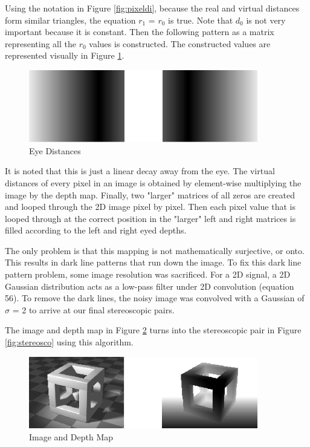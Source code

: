 \documentclass[12pt]{article}
\begin{document}
Using the notation in Figure \ref{fig:pixeldi}, because the real and virtual distances form similar triangles, the equation \(r_{1}\) = \(r_{0}\) is true. Note that \(d_{0}\) is not very important because it is constant. Then the following pattern as a matrix representing all the \(r_{0}\) values is constructed. The constructed values are represented visually in Figure \ref{fig:eyedistance}.

\begin{figure}
    \centering
    \includegraphics[width=100mm]{eye_distances.png}
    \caption{Eye Distances}
    \label{fig:eyedistance}
\end{figure}

It is noted that this is just a linear decay away from the eye.
The virtual distances of every pixel in an image is obtained by element-wise multiplying the image by the depth map. Finally, two "larger" matrices of all zeros are created and looped through the 2D image pixel by pixel.
Then each pixel value that is looped through at the correct position in the "larger" left and right matrices is filled according to the left and right eyed depths.

The only problem is that this mapping is not mathematically surjective, or onto. This results in dark line patterns that run down the image. To fix this dark line pattern problem, some image resolution was sacrificed. For a 2D signal, a 2D Gaussian distribution acts as a low-pass filter under 2D convolution (equation 56). To remove the dark lines, the noisy image was convolved with a Gaussian of \(\sigma\) = 2 to arrive at our final stereoscopic pairs.

The image and depth map in Figure \ref{fig:imadep} turns into the stereoscopic pair in Figure \ref{fig:stereosco} using this algorithm.

\begin{figure}
    \centering
    \includegraphics[width=100mm]{image_depth_pair.png}
    \caption{Image and Depth Map}
    \label{fig:imadep}
\end{figure}
\end{document}
